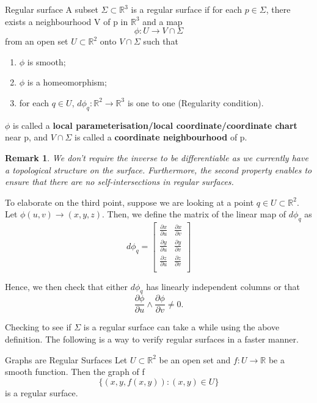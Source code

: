 \documentclass[twoside]{article}
\newtheorem{remark}[theorem]{Remark}
\begin{document}
\begin{definition_exam}{Regular surface}{} A subset $\Sigma \subset \mathbb{R}^3$ is a regular surface if for each $p \in \Sigma$, there exists a neighbourhood V of p in $\mathbb{R}^3$ and a map 
$$
\phi: U \rightarrow V \cap \Sigma
$$
from an open set $U \subset \mathbb{R}^2$ onto $V \cap \Sigma$ such that 
\begin{enumerate}
\item $\phi$ is smooth;
\item $\phi$ is a homeomorphism;
\item for each $q \in U$, $d\phi_q: \mathbb{R}^2 \rightarrow \mathbb{R}^3$ is one to one (Regularity condition).
\end{enumerate}
$\phi$ is called a \textbf{local parameterisation/local coordinate/coordinate chart} near p, and $V \cap \Sigma$ is called a \textbf{coordinate neighbourhood} of p.
\end{definition_exam}

\begin{remark}We don't require the inverse to be differentiable as we currently have a topological structure on the surface. Furthermore, the second property enables to ensure that there are no self-intersections in regular surfaces.
\end{remark}


To elaborate on the third point, suppose we are looking at a point $q \in U \subset \mathbb{R}^2.$ Let $\phi(u,v) \rightarrow (x,y,z).$ Then, we define the matrix of the linear map of $d\phi_q$ as 
$$
d\phi_q = 
\begin{bmatrix}
\frac{\partial x}{\partial u} & \frac{\partial x}{\partial v}\\
\frac{\partial y}{\partial u} & \frac{\partial y}{\partial v}\\
\frac{\partial z}{\partial u} & \frac{\partial z}{\partial v}\\
\end{bmatrix}
$$

Hence, we then check that either $d\phi_q$ has linearly independent columns or that 
$$
\frac{\partial \phi}{\partial u} \wedge \frac{\partial \phi}{\partial v} \neq 0.
$$

Checking to see if $\Sigma$ is a regular surface can take a while using the above definition. The following is a way to verify regular surfaces in a faster manner.

\begin{proposition_exam}{Graphs are Regular Surfaces}{} Let $U \subset \mathbb{R}^2$ be an open set and $f: U \rightarrow \mathbb{R}$ be a smooth function. Then the graph of f
$$
\{(x,y,f(x,y)): (x,y) \in U\}
$$
is a regular surface.
\end{proposition_exam}
\end{document}
